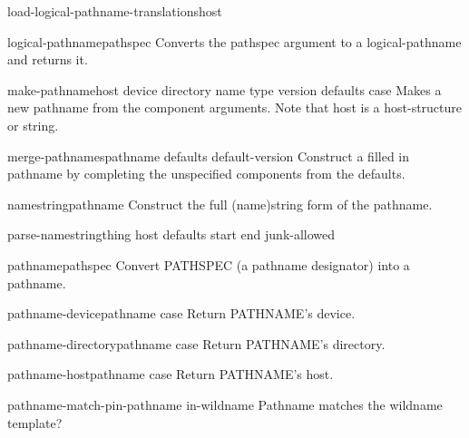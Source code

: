 \begin{function}{load-logical-pathname-translations}{host}{}{}
  
\end{function}

\begin{function}{logical-pathname}{pathspec}{}{}
  Converts the pathspec argument to a logical-pathname and returns it.
\end{function}

\begin{function}{make-pathname}{\key host device directory name type version defaults case}{}{}
  Makes a new pathname from the component arguments. Note that host is
a host-structure or string.
\end{function}

\begin{function}{merge-pathnames}{pathname \op defaults default-version}{}{}
  Construct a filled in pathname by completing the unspecified components
   from the defaults.
\end{function}

\begin{function}{namestring}{pathname}{}{}
  Construct the full (name)string form of the pathname.
\end{function}

\begin{function}{parse-namestring}{thing \op host defaults \key start end junk-allowed}{}{}
  
\end{function}

\begin{function}{pathname}{pathspec}{}{}
  Convert PATHSPEC (a pathname designator) into a pathname.
\end{function}

\begin{function}{pathname-device}{pathname \key case}{}{}
  Return PATHNAME's device.
\end{function}

\begin{function}{pathname-directory}{pathname \key case}{}{}
  Return PATHNAME's directory.
\end{function}

\begin{function}{pathname-host}{pathname \key case}{}{}
  Return PATHNAME's host.
\end{function}

\begin{function}{pathname-match-p}{in-pathname in-wildname}{}{}
  Pathname matches the wildname template?
\end{function}


